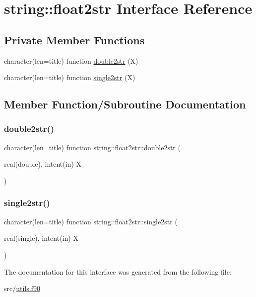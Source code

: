 \hypertarget{interfacestring_1_1float2str}{}\section{string\+:\+:float2str Interface Reference}
\label{interfacestring_1_1float2str}
\subsection*{Private Member Functions}
\begin{DoxyCompactItemize}
\item 
character(len=title) function \hyperlink{interfacestring_1_1float2str_a2fcaf4fe5a7a6482089bcdb7ef00d16e}{double2str} (X)
\item 
character(len=title) function \hyperlink{interfacestring_1_1float2str_afd5dc692bff7633a54d493dcc93df16f}{single2str} (X)
\end{DoxyCompactItemize}


\subsection{Member Function/\+Subroutine Documentation}
\mbox{\label{interfacestring_1_1float2str_a2fcaf4fe5a7a6482089bcdb7ef00d16e}} 
\subsubsection{\texorpdfstring{double2str()}{double2str()}}
{\footnotesize\ttfamily character(len=title) function string\+::float2str\+::double2str (\begin{DoxyParamCaption}\item[{real(double), intent(in)}]{X }\end{DoxyParamCaption})\hspace{0.3cm}{\ttfamily [private]}}

\mbox{\label{interfacestring_1_1float2str_afd5dc692bff7633a54d493dcc93df16f}} 
\subsubsection{\texorpdfstring{single2str()}{single2str()}}
{\footnotesize\ttfamily character(len=title) function string\+::float2str\+::single2str (\begin{DoxyParamCaption}\item[{real(single), intent(in)}]{X }\end{DoxyParamCaption})\hspace{0.3cm}{\ttfamily [private]}}



The documentation for this interface was generated from the following file\+:\begin{DoxyCompactItemize}
\item 
src/\hyperlink{utils_8f90}{utils.\+f90}\end{DoxyCompactItemize}
